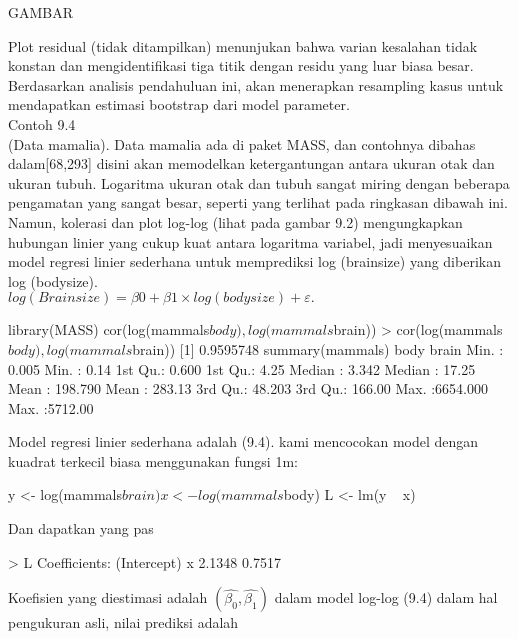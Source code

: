 \documentclass[a4paper,12pt]{article}
\theoremstyle{definition}
\begin{document}

GAMBAR

Plot residual (tidak ditampilkan) menunjukan bahwa varian kesalahan tidak konstan dan mengidentifikasi tiga titik dengan residu yang luar biasa besar. Berdasarkan analisis pendahuluan ini, akan menerapkan resampling kasus untuk mendapatkan estimasi bootstrap dari model parameter.\\

Contoh 9.4\\

(Data mamalia). Data mamalia ada di paket MASS, dan contohnya dibahas dalam[68,293] disini akan memodelkan ketergantungan antara ukuran otak dan ukuran tubuh. Logaritma ukuran otak dan tubuh sangat miring dengan beberapa pengamatan yang sangat besar, seperti yang terlihat pada ringkasan dibawah ini. Namun, kolerasi dan plot log-log (lihat pada gambar 9.2) mengungkapkan hubungan linier yang cukup kuat antara logaritma variabel, jadi menyesuaikan model regresi linier sederhana untuk memprediksi log (brainsize) yang diberikan log (bodysize).\\

$log(Brainsize)=+\times log(bodysize)+\varepsilon.$

\begin{spverbatim}
library(MASS)
cor(log(mammals$body), log(mammals$brain))
> cor(log(mammals$body), log(mammals$brain))
[1] 0.9595748
summary(mammals)
body brain
Min. : 0.005 Min. : 0.14
1st Qu.: 0.600 1st Qu.: 4.25
Median : 3.342 Median : 17.25
Mean : 198.790 Mean : 283.13
3rd Qu.: 48.203 3rd Qu.: 166.00
Max. :6654.000 Max. :5712.00
\end{spverbatim}

Model regresi linier sederhana adalah (9.4). kami mencocokan model dengan kuadrat terkecil biasa menggunakan fungsi 1m:
\begin{spverbatim}
y <- log(mammals$brain)
x <- log(mammals$body)
L <- lm(y ~ x)
\end{spverbatim}
Dan dapatkan yang pas
\begin{spverbatim}
> L
Coefficients:
(Intercept)        x
2.1348          0.7517
\end{spverbatim}
Koefisien yang diestimasi adalah $(,)$ dalam model log-log (9.4) dalam hal pengukuran asli, nilai prediksi adalah\\
\end{document}
